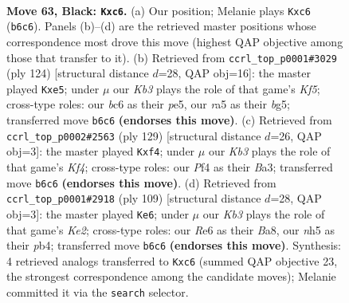 \documentclass[11pt]{article}
\begin{document}
\clearpage

\begin{figure}[p]\centering
\begin{subfigure}{0.46\textwidth}\centering
\resizebox{\linewidth}{!}{%
\newchessgame
\chessboard[
  setfen={8/8/1kB1r3/R6N/1P3p2/8/6P1/1K6 b - - 3 63},
  showmover=false,
  pgfstyle=straightmove, color=movearrow, markmove={b6-c6}
]}
\caption{}
\end{subfigure}\hfill
\begin{subfigure}{0.46\textwidth}\centering
\resizebox{\linewidth}{!}{%
\newchessgame
\chessboard[
  setfen={8/8/B6p/4pKbP/8/5k2/8/8 w - - 0 63},
  showmover=false,
  pgfstyle=straightmove, color=movearrow, markmove={f5-e5}
]}
\caption{}
\end{subfigure}
\\[4pt]
\begin{subfigure}{0.46\textwidth}\centering
\resizebox{\linewidth}{!}{%
\newchessgame
\chessboard[
  setfen={8/8/2K5/4Rk2/2B2P2/bP6/3r4/8 b - - 2 65},
  showmover=false,
  pgfstyle=straightmove, color=movearrow, markmove={f5-f4}
]}
\caption{}
\end{subfigure}\hfill
\begin{subfigure}{0.46\textwidth}\centering
\resizebox{\linewidth}{!}{%
\newchessgame
\chessboard[
  setfen={b7/1R2k3/P7/8/1P4p1/2N1K3/8/r7 b - - 1 55},
  showmover=false,
  pgfstyle=straightmove, color=movearrow, markmove={e7-e6}
]}
\caption{}
\end{subfigure}
\caption{\textbf{Move 63, Black: \texttt{Kxc6}.} (a) Our position; Melanie plays \texttt{Kxc6} (\texttt{b6c6}). Panels (b)--(d) are the retrieved master positions whose correspondence most drove this move (highest QAP objective among those that transfer to it). (b) Retrieved from \texttt{ccrl\_top\_p0001\#3029} (ply 124) [structural distance $d$=28, QAP obj=16]: the master played \texttt{Kxe5}; under $\mu$ our \emph{Kb3} plays the role of that game's \emph{Kf5}; cross-type roles: our \emph{b}c6 as their \emph{p}e5, our \emph{r}a5 as their \emph{b}g5; transferred move \texttt{b6c6} \textbf{(endorses this move)}. (c) Retrieved from \texttt{ccrl\_top\_p0002\#2563} (ply 129) [structural distance $d$=26, QAP obj=3]: the master played \texttt{Kxf4}; under $\mu$ our \emph{Kb3} plays the role of that game's \emph{Kf4}; cross-type roles: our \emph{P}f4 as their \emph{B}a3; transferred move \texttt{b6c6} \textbf{(endorses this move)}. (d) Retrieved from \texttt{ccrl\_top\_p0001\#2918} (ply 109) [structural distance $d$=28, QAP obj=3]: the master played \texttt{Ke6}; under $\mu$ our \emph{Kb3} plays the role of that game's \emph{Ke2}; cross-type roles: our \emph{R}e6 as their \emph{B}a8, our \emph{n}h5 as their \emph{p}b4; transferred move \texttt{b6c6} \textbf{(endorses this move)}. Synthesis: 4 retrieved analogs transferred to \texttt{Kxc6} (summed QAP objective 23, the strongest correspondence among the candidate moves); Melanie committed it via the \texttt{search} selector.}
\label{fig:thought-m125}
\end{figure}
\end{document}

